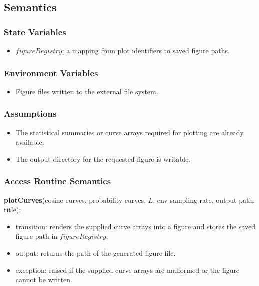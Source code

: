 \documentclass[12pt, titlepage]{article}
\begin{document}
\subsection{Semantics}

\subsubsection{State Variables}

\begin{itemize}
    \item $figureRegistry$: a mapping from plot identifiers to saved figure paths.
\end{itemize}

\subsubsection{Environment Variables}

\begin{itemize}
    \item Figure files written to the external file system.
\end{itemize}

\subsubsection{Assumptions}

\begin{itemize}
    \item The statistical summaries or curve arrays required for plotting are already available.
    \item The output directory for the requested figure is writable.
\end{itemize}

\subsubsection{Access Routine Semantics}

\noindent \textbf{plotCurves}(cosine curves, probability curves, $L$, env sampling rate, output path, title):
\begin{itemize}
    \item transition: renders the supplied curve arrays into a figure and stores the saved figure path in $figureRegistry$.
    \item output: returns the path of the generated figure file.
    \item exception: raised if the supplied curve arrays are malformed or the figure cannot be written.
\end{itemize}
\end{document}

